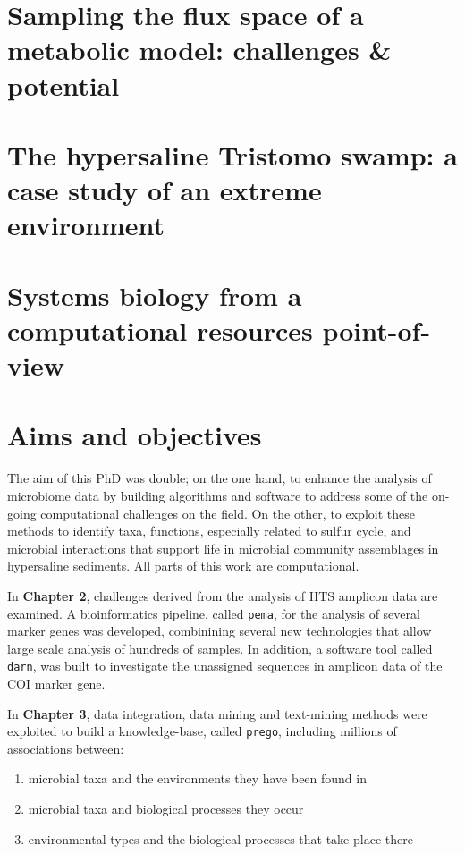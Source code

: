 \section{Sampling the flux space of a metabolic model: challenges \& potential}



\section{The hypersaline Tristomo swamp: a case study of an extreme environment}


\section{Systems biology from a computational resources point-of-view}





\section{Aims and objectives}

The aim of this PhD was double; 
on the one hand, to enhance the analysis of microbiome data by building algorithms and software to address some of the on-going computational challenges on the field.
On the other, to exploit these methods to identify taxa, functions, especially related to sulfur cycle, and microbial interactions that support life in microbial community assemblages in hypersaline sediments.
All parts of this work are computational. 

In \textbf{Chapter 2}, challenges derived from the analysis of HTS amplicon data are examined.
A bioinformatics pipeline, called \texttt{pema}, for the analysis of several marker genes was developed, combinining several new technologies that allow large scale analysis of hundreds of samples. 
In addition, a software tool called \texttt{darn}, was built to investigate the unassigned sequences in amplicon data of the COI marker gene. 

In \textbf{Chapter 3}, data integration, data mining and text-mining methods were exploited to build a knowledge-base, called \texttt{prego}, including millions of associations between:
\begin{enumerate}
   \item microbial taxa and the environments they have been found in 
   \item microbial taxa and biological processes they occur
   \item environmental types and the biological processes that take place there
\end{enumerate}

